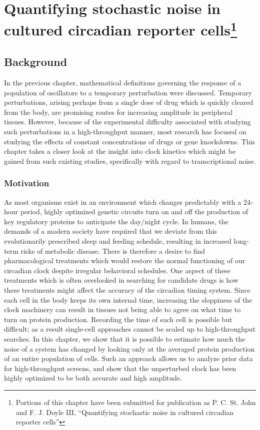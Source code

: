\chapter[Quantifying stochastic noise in cultured circadian reporter cells]{Quantifying stochastic noise in cultured circadian reporter cells\footnote{Portions of this chapter have been submitted for publication as P. C. St. John  and F. J. Doyle III, ``Quantifying stochastic noise in cultured circadian reporter cells''}}\label{chap:decay}

\section{Background}

In the previous chapter, mathematical definitions governing the response of a population of oscillators to a temporary perturbation were discussed.
Temporary perturbations, arising perhaps from a single dose of drug which is quickly cleared from the body, are promising routes for increasing amplitude in peripheral tissues.
However, because of the experimental difficulty associated with studying such perturbations in a high-throughput manner, most research has focused on studying the effects of constant concentrations of drugs or gene knockdowns.
This chapter takes a closer look at the insight into clock kinetics which might be gained from such existing studies, specifically with regard to transcriptional noise.

\subsection{Motivation}
As most organisms exist in an environment which changes predictably with a 24-hour period, highly optimized genetic circuits turn on and off the production of key regulatory proteins to anticipate the day/night cycle.
In humans, the demands of a modern society have required that we deviate from this evolutionarily prescribed sleep and feeding schedule, resulting in increased long-term risks of metabolic disease.
There is therefore a desire to find pharmacological treatments which would restore the normal functioning of our circadian clock despite irregular behavioral schedules.
One aspect of these treatments which is often overlooked in searching for candidate drugs is how these treatments might affect the accuracy of the circadian timing system.
Since each cell in the body keeps its own internal time, increasing the sloppiness of the clock machinery can result in tissues not being able to agree on what time to turn on protein production.
Recording the time of each cell is possible but difficult; as a result single-cell approaches cannot be scaled up to high-throughput searches.
In this chapter, we show that it is possible to estimate how much the noise of a system has changed by looking only at the averaged protein production of an entire population of cells.
Such an approach allows us to analyze prior data for high-throughput screens, and show that the unperturbed clock has been highly optimized to be both accurate and high amplitude.

